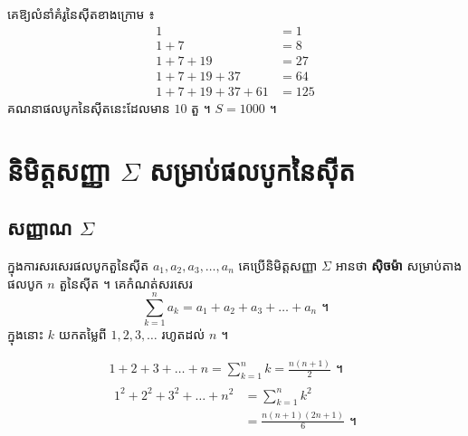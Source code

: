 \begin{pro}
គេឱ្យលំនាំគំរូនៃស៊ីតខាងក្រោម ៖
\[
\begin{aligned}
1 &= 1\\
1 + 7 &= 8\\
1 + 7 + 19 &= 27\\
1 + 7 + 19 + 37 &= 64\\
1 + 7 + 19 + 37 + 61 &= 125
\end{aligned}
\]
គណនាផលបូកនៃស៊ីតនេះដែលមាន $10$ តួ ។
\ans
$S = 1000$ ។
\end{pro}

\section{និមិត្តសញ្ញា \texorpdfstring{$\Sigma$}{Σ} សម្រាប់ផលបូកនៃស៊ីត}
\subsection{សញ្ញាណ \texorpdfstring{$\Sigma$}{Σ}}

ក្នុងការសរសេរផលបូកតួនៃស៊ីត $a_1, a_2, a_3, \ldots, a_n$ គេប្រើនិមិត្តសញ្ញា $\Sigma$ អានថា \textbf{ស៊ិចម៉ា} សម្រាប់តាងផលបូក $n$ តួនៃស៊ីត ។ គេកំណត់សរសេរ
\[ \sum_{k=1}^{n} a_k = a_1 + a_2 + a_3 + \ldots + a_n \text{ ។} \]
ក្នុងនោះ $k$ យកតម្លៃពី $1, 2, 3, \ldots$ រហូតដល់ $n$ ។

\begin{example}[ឧទាហរណ៍]
\[
\begin{gathered}
1 + 2 + 3 + \ldots + n = \sum_{k=1}^{n} k = \frac{n(n+1)}{2} \text{ ។}\\
\begin{aligned}
1^2 + 2^2 + 3^2 + \ldots + n^2 &= \sum_{k=1}^{n} k^2\\
&= \frac{n(n+1)(2n+1)}{6} \text{ ។}
\end{aligned}
\end{gathered}
\]
\end{example}

